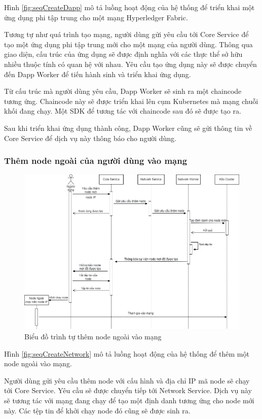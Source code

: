 \documentclass[../DoAn.tex]{subfiles}
\begin{document}
Hình \ref{fig:seqCreateDapp} mô tả luồng hoạt động của hệ thống để triển khai
một ứng dụng phi tập trung cho một mạng Hyperledger Fabric.

Tương tự như quá trình tạo mạng, người dùng gửi yêu cầu tới Core Service để tạo
một ứng dụng phi tập trung mới cho một mạng của người dùng. Thông qua giao
diện, cấu trúc của ứng dụng sẽ được định nghĩa với các thực thể sở hữu nhiều
thuộc tính có quan hệ với nhau. Yêu cầu tạo ứng dụng này sẽ được chuyển đến
Dapp Worker để tiến hành sinh và triển khai ứng dụng.

Từ cấu trúc mà người dùng yêu cầu, Dapp Worker sẽ sinh ra một chaincode tương
ứng. Chaincode này sẽ được triển khai lên cụm Kubernetes mà mạng chuỗi khối
đang chạy. Một SDK để tương tác với chaincode sau đó sẽ được tạo ra.

Sau khi triển khai ứng dụng thành công, Dapp Worker cũng sẽ gửi thông tin về
Core Service để dịch vụ này thông báo cho người dùng.

\subsubsection{Thêm node ngoài của người dùng vào mạng}

\begin{figure}[H]
    \centering
    \includegraphics[width=0.75\linewidth]{Hinhve/DoAn-seqAddNode.drawio.png}
    \caption{Biểu đồ trình tự thêm node ngoài vào mạng}
    \label{fig:seqAddNode}
\end{figure}

Hình \ref{fig:seqCreateNetwork} mô tả luồng hoạt động của hệ thống để thêm một
node ngoài vào mạng.

Người dùng gửi yêu cầu thêm node với cấu hình và địa chỉ IP mã node sẽ chạy tới
Core Service. Yêu cầu sẽ được chuyển tiếp tới Network Service. Dịch vụ này sẽ
tương tác với mạng đang chạy để tạo một định danh tương ứng cho node mới này.
Các tệp tin để khởi chạy node đó cũng sẽ được sinh ra.
\end{document}
